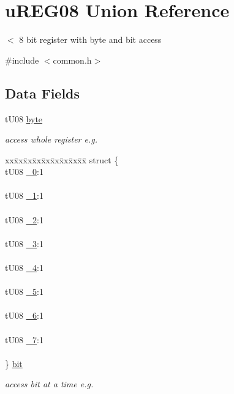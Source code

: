 \hypertarget{unionu_r_e_g08}{}\section{u\+R\+E\+G08 Union Reference}
\label{unionu_r_e_g08}


$<$ 8 bit register with byte and bit access  




{\ttfamily \#include $<$common.\+h$>$}

\subsection*{Data Fields}
\begin{DoxyCompactItemize}
\item 
t\+U08 \hyperlink{unionu_r_e_g08_aba308d63db050aed25cfd36c37e41ad4}{byte}
\begin{DoxyCompactList}\small\item\em access whole register e.\+g. \end{DoxyCompactList}\item 
\begin{tabbing}
xx\=xx\=xx\=xx\=xx\=xx\=xx\=xx\=xx\=\kill
struct \{\\
\>tU08 \hyperlink{unionu_r_e_g08_a279fd80ee4351fc75ea79694d12964c2}{\_0}:1\\
\>\\
\>tU08 \hyperlink{unionu_r_e_g08_ac5bce31e70012e98c2726a0417e8d3cf}{\_1}:1\\
\>\\
\>tU08 \hyperlink{unionu_r_e_g08_a814b8aa20705730bc360d8d3684bf490}{\_2}:1\\
\>\\
\>tU08 \hyperlink{unionu_r_e_g08_a0ec4e20296b24d1006ed9dbe9db75807}{\_3}:1\\
\>\\
\>tU08 \hyperlink{unionu_r_e_g08_a9a95047ce29ebd481e1989638216eeae}{\_4}:1\\
\>\\
\>tU08 \hyperlink{unionu_r_e_g08_a994fd9d4b5164703cd507f7146e405e0}{\_5}:1\\
\>\\
\>tU08 \hyperlink{unionu_r_e_g08_ab8f242ba187ae47b8a353c2712a22fb4}{\_6}:1\\
\>\\
\>tU08 \hyperlink{unionu_r_e_g08_a6dcc44f35fe0d522d065212bf580f3d5}{\_7}:1\\
\>\\
\} \hyperlink{unionu_r_e_g08_aa2f8474dc62c9ed43e927c04a4c9319d}{bit}\\

\end{tabbing}\begin{DoxyCompactList}\small\item\em access bit at a time e.\+g. \end{DoxyCompactList}\end{DoxyCompactItemize}



